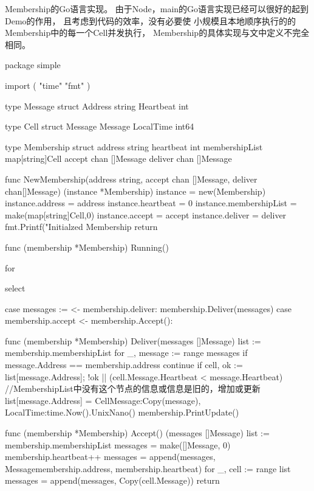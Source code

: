 Membership的Go语言实现。
由于Node，main的Go语言实现已经可以很好的起到Demo的作用，
且考虑到代码的效率，没有必要使
小规模且本地顺序执行的的Membership中的每一个Cell并发执行，
Membership的具体实现与文中定义不完全相同。
\begin{codeblock}[language=GO]
	package simple

	import (
		"time"
		"fmt"
	)
	
	type Message struct {
		Address string
		Heartbeat int
	}
	
	type Cell struct {
		Message Message
		LocalTime int64
	}
	
	type Membership struct {
		address string
		heartbeat int
		membershipList map[string]Cell
		accept chan []Message
		deliver chan []Message
	}
	
	func NewMembership(address string, accept chan []Message, deliver chan[]Message) (instance *Membership){
		instance = new(Membership)
		instance.address = address
		instance.heartbeat = 0
		instance.membershipList = make(map[string]Cell,0)
		instance.accept = accept
		instance.deliver = deliver
		fmt.Printf("Initialzed Membership %
		return
	}
	
	func (membership *Membership) Running() {
		for {
			select {
			case messages := <- membership.deliver:
				membership.Deliver(messages)
			case membership.accept <- membership.Accept():
	
			}
		}
	}
	
	func (membership *Membership) Deliver(messages []Message) {
		list := membership.membershipList
		for _, message := range messages {
			if message.Address == membership.address {
				continue
			}
			if cell, ok := list[message.Address]; !ok || (cell.Message.Heartbeat < message.Heartbeat) {
				//MembershipList中没有这个节点的信息或信息是旧的，增加或更新
				list[message.Address] = Cell{Message:Copy(message), LocalTime:time.Now().UnixNano()}
			} 
		}
		membership.PrintUpdate()
	}
	
	func (membership *Membership) Accept() (messages []Message) {
		list := membership.membershipList
		messages = make([]Message, 0)
		membership.heartbeat++
		messages = append(messages, Message{membership.address, membership.heartbeat})
		for _, cell := range list {
			messages = append(messages, Copy(cell.Message))
		}
		return
	}
\end{codeblock}
